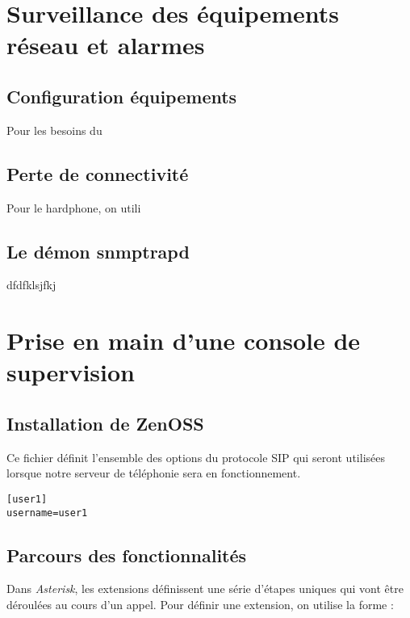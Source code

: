 \documentclass[12pt,a4paper,notitlepage]{article}
\begin{document}
\section{Surveillance des équipements réseau et alarmes}
\subsection{Configuration équipements}
Pour les besoins du

\subsection{Perte de connectivité}
Pour le hardphone, on utili

\subsection{Le démon snmptrapd}
dfdfklsjfkj

\section{Prise en main d'une console de supervision}
\subsection{Installation de ZenOSS}
Ce fichier définit l'ensemble des options du protocole SIP qui seront utilisées lorsque notre serveur de téléphonie sera en fonctionnement. \\
\begin{lstlisting}[title=sip.conf v1]
[user1]
username=user1
\end{lstlisting}

\subsection{Parcours des fonctionnalités}

Dans \textit{Asterisk}, les extensions définissent une série d'étapes uniques qui vont être déroulées au cours d'un appel. Pour définir une extension, on utilise la forme : \\

\end{document}

